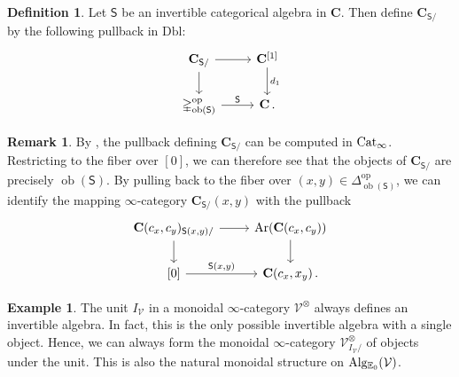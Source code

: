 \documentclass[10pt]{amsart}
\numberwithin{equation}{section}
\theoremstyle{definition}
\newtheorem{definition}[prop]{Definition}
\newtheorem{ex}[prop]{Example}
\newtheorem{rem}[prop]{Remark}
\DeclareMathOperator{\ob}{ob}
\DeclareMathOperator{\op}{op}
\DeclareMathOperator{\Ar}{Ar}
\newcommand{\Cat}{\mathrm{Cat}\vphantom{t}}
\newcommand{\Alg}{\mathrm{Alg}\vphantom{z}}
\newcommand{\bE}{\mathbb{E}}
\newcommand{\Simp}{\mathbb{\Delta}}
\newcommand{\cV}{\mathcal{V}}
\newcommand{\bfC}{\mathbf{C}}
\newcommand{\sfS}{\mathsf{S}}
\newcommand{\Dbl}{\mathrm{Dbl}}
\begin{document}
	\begin{definition}\label{def:under_slice_double_cat}
		Let $\sfS$ be an invertible categorical algebra in $\bfC$.
    Then define $\bfC_{\sfS/}$ by the following pullback in $\Dbl$:
		\begin{equation*}
			\begin{tikzcd}
				\bfC_{\sfS/} \arrow[r] \arrow[d] &  \bfC^{[1]} \arrow[d, "d_{1}"]  \\
				\Simp_{\ob(\sfS)}^{\op} \arrow[r, "\sfS"] & \bfC \,.
			\end{tikzcd}
		\end{equation*}

	\end{definition}
	\begin{rem}\label{rem:unwinding_under_slice}
		By , the pullback defining $\bfC_{\sfS/}$ can be computed in $\Cat_{\infty}$. Restricting to the fiber over $[0]$, we can therefore see that the objects of $\bfC_{\sfS/}$ are precisely $\ob(\sfS)$.
    By pulling back to the fiber over $(x,y)\in \Simp^{\op}_{\ob(\sfS)}$, we can identify the mapping $\infty$-category $\bfC_{\sfS/}(x,y)$ with the pullback
		\begin{equation*}
			\begin{tikzcd}
				\bfC(c_{x},c_{y})_{\sfS(x,y)/} \arrow[r] \arrow[d]      &   \Ar( \bfC(c_{x},c_{y}) )  \arrow[d] \\
				{[0]}  \arrow[r, "{\sfS(x,y)}"]               &   \bfC(c_{x},x_{y}) \, .
			\end{tikzcd}
		\end{equation*}
	\end{rem}
	\begin{ex}\label{ex:unit_algebra}
		The unit $I_{\cV}$ in a monoidal $\infty$-category $\cV^{\otimes}$ always defines an invertible algebra.
		In fact, this is the only possible invertible algebra with a single object.
		Hence, we can always form the monoidal $\infty$-category $\cV_{I_{\cV}/}^{\otimes}$ of objects under the unit.
		This is also the natural monoidal structure on $\Alg_{\bE_{0}}(\cV)$.
	\end{ex}
\end{document}
